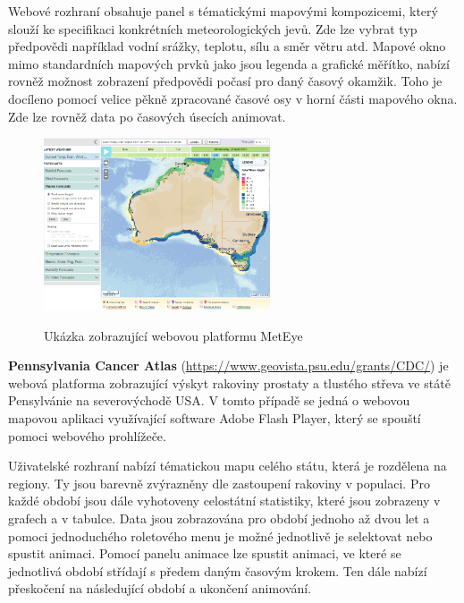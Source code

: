 Webové rozhraní obsahuje panel s tématickými mapovými kompozicemi, 
který slouží ke specifikaci konkrétních meteorologických jevů. 
Zde lze vybrat typ předpovědi 
například vodní srážky, teplotu, sílu a směr větru atd. Mapové okno
mimo standardních mapových prvků jako jsou legenda a grafické měřítko,
nabízí rovněž možnost zobrazení předpovědi počasí pro daný časový
okamžik. Toho je docíleno pomocí velice pěkně zpracované časové osy v
horní části mapového okna. Zde lze rovněž data po časových
úsecích animovat.


\begin{figure}[h!]  \centering
\includegraphics[width=0.6\textwidth]{./img/meteye.png}
	\caption{Ukázka zobrazující webovou platformu MetEye}
	\cite{met-eye}
	\label{fig:met-eye}
\end{figure}

\newpage

\textbf{Pennsylvania Cancer Atlas}
(\url{https://www.geovista.psu.edu/grants/CDC/}) je webová platforma
zobrazující výskyt rakoviny prostaty a tlustého střeva ve státě
Pensylvánie na severovýchodě USA. V tomto případě se jedná o webovou
mapovou aplikaci využívající software Adobe Flash Player, který se
spouští pomoci webového prohlížeče.

Uživatelské rozhraní nabízí tématickou mapu celého státu, která je
rozdělena na regiony. Ty jsou barevně zvýrazněny dle zastoupení
rakoviny v populaci. Pro každé období jsou dále vyhotoveny celostátní
statistiky, které jsou zobrazeny v grafech a v tabulce. Data jsou
zobrazována pro období jednoho až dvou let a pomoci jednoduchého
roletového menu je možné jednotlivě je selektovat nebo spustit
animaci. Pomocí panelu animace lze spustit animaci, ve které se
jednotlivá období střídají s předem daným časovým krokem. Ten dále
nabízí přeskočení na následující období a ukončení animování.

